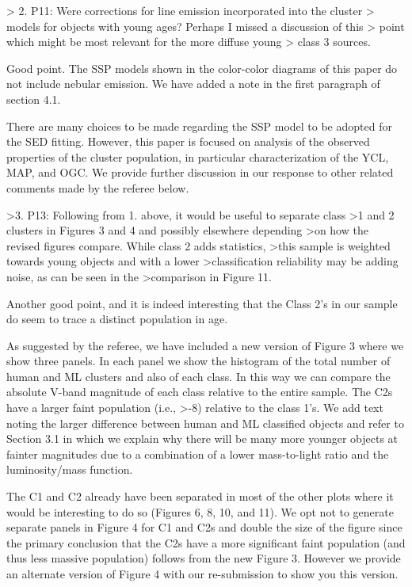 > 2. P11: Were corrections for line emission incorporated into the cluster 
> models for objects with young ages? Perhaps I missed a discussion of this 
> point which might be most relevant for the more diffuse young 
> class 3 sources.

Good point.  The SSP models shown in the color-color diagrams of this paper do not include nebular emission.  We have added a note in the first paragraph of section 4.1.

There are many choices to be made regarding the SSP model to be adopted for the SED fitting.  However, this paper is focused on analysis of the observed properties of the cluster population, in particular characterization of the YCL, MAP, and OGC.  We provide further discussion in our response to other related comments made by the referee below.




>3. P13: Following from 1. above, it would be useful to separate class
>1 and 2 clusters in Figures 3 and 4 and possibly elsewhere depending 
>on how the revised figures compare. While class 2 adds statistics, 
>this sample is weighted towards young objects and with a lower 
>classification reliability may be adding noise, as can be seen in the
>comparison in Figure 11.


Another good point, and it is indeed interesting that the Class 2's in our sample do seem to trace a distinct population in age. 

As suggested by the referee, we have included a new version of Figure 3 where we show three panels. In each panel we show the histogram of the total number of human and ML clusters and also of each class.  In this way we can compare the absolute V-band magnitude of each class relative to the entire sample.  The C2s have a larger faint population (i.e., >-8) relative to the class 1's. We add text noting the larger difference between human and ML classified objects and refer to Section 3.1 in which we explain why there will be many more younger objects at fainter magnitudes due to a combination of a lower mass-to-light ratio and the luminosity/mass function.

The C1 and C2 already have been separated in most of the other plots where it would be interesting to do so (Figures 6, 8, 10, and 11).  We opt not to generate separate panels in Figure 4 for C1 and C2s and double the size of the figure since the primary conclusion that the C2s have a more significant faint population (and thus less massive population) follows from the new Figure 3. However we provide an alternate version of Figure 4 with our re-submission to show you this version.



